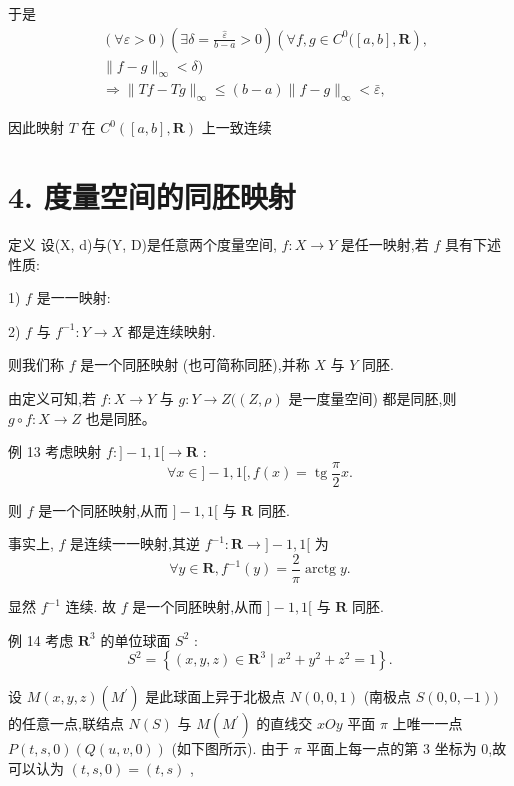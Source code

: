 于是
\begin{align*}
	&\left( {\forall \varepsilon  > 0}\right) \left( {\exists \delta  = \frac{\widehat{\varepsilon }}{b - a} > 0}\right) \left( {\forall f,g \in  {C}^{0}(\left\lbrack  {a,b}\right\rbrack  ,\mathbf{R}}\right) ,\\
	&\parallel f - g{\parallel }_{\infty } < \delta )\\
	&\Rightarrow  \parallel {Tf} - {Tg}{\parallel }_{\infty } \leq  \left( {b - a}\right) \parallel f - g{\parallel }_{\infty } < \bar{\varepsilon },
\end{align*}

因此映射 $T$ 在 ${C}^{0}\left( {\left\lbrack  {a,b}\right\rbrack  ,\mathbf{R}}\right)$ 上一致连续

\section*{4. 度量空间的同胚映射}

定义 设(X, d)与(Y, D)是任意两个度量空间, $f : X \rightarrow  Y$ 是任一映射,若 $f$ 具有下述性质:

1) $f$ 是一一映射:

2) $f$ 与 ${f}^{-1} : Y \rightarrow  X$ 都是连续映射.

则我们称 $f$ 是一个同胚映射 (也可简称同胚),并称 $X$ 与 $Y$ 同胚.

由定义可知,若 $f : X \rightarrow  Y$ 与 $g : Y \rightarrow  Z(\left( {Z,\rho }\right)$ 是一度量空间) 都是同胚,则 $g \circ  f : X \rightarrow  Z$ 也是同胚。

例 13 考虑映射 $f : \rbrack  - 1,1\lbrack  \rightarrow  \mathbf{R}$ :
$$\forall x \in  \rbrack  - 1,1\lbrack ,f\left( x\right)  = \operatorname{tg}\frac{\pi }{2}x.$$

则 $f$ 是一个同胚映射,从而 $\rbrack  - 1,1\lbrack$ 与 $\mathbf{R}$ 同胚.

事实上, $f$ 是连续一一映射,其逆 ${f}^{-1} : \mathbf{R} \rightarrow  \rbrack  - 1,1\lbrack$ 为
$$\forall y \in  \mathbf{R},{f}^{-1}\left( y\right)  = \frac{2}{\pi }\operatorname{arctg}y.$$

显然 ${f}^{-1}$ 连续. 故 $f$ 是一个同胚映射,从而 $\rbrack  - 1,1\lbrack$ 与 $\mathbf{R}$ 同胚.

例 14 考虑 ${\mathbf{R}}^{3}$ 的单位球面 ${S}^{2}$ :
$${S}^{2} = \left\{  {\left( {x,y,z}\right)  \in  {\mathbf{R}}^{3} \mid  {x}^{2} + {y}^{2} + {z}^{2} = 1}\right\}  .$$

设 $M\left( {x,y,z}\right) \left( {M}^{\prime }\right)$ 是此球面上异于北极点 $N\left( {0,0,1}\right)$ (南极点 $S\left( {0,0, - 1}\right) )$ 的任意一点,联结点 $N\left( S\right)$ 与 $M\left( {M}^{\prime }\right)$ 的直线交 ${xOy}$ 平面 $\pi$ 上唯一一点 $P\left( {t,s,0}\right) \left( {Q\left( {u,v,0}\right) }\right)$ (如下图所示). 由于 $\pi$ 平面上每一点的第 3 坐标为 0,故可以认为 $\left( {t,s,0}\right)  = \left( {t,s}\right)$ ,

